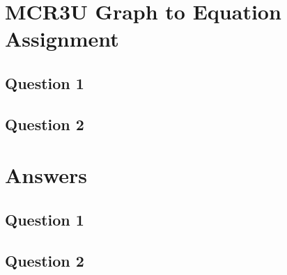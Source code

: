 \documentclass[12pt]{article}
\begin{document}
\section*{MCR3U Graph to Equation Assignment}

\subsection*{Question 1}
\begin{center}
\end{center}

\subsection*{Question 2}
\begin{center}
\end{center}



\newpage

\section*{Answers}
\subsection*{Question 1}


\subsection*{Question 2}

\newpage
\end{document}
